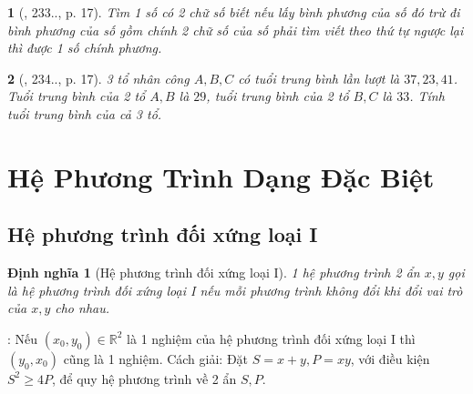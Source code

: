 \documentclass{article}
\newtheorem{baitoan}{}
\newtheorem{dinhnghia}{Định nghĩa}
\begin{document}
\begin{baitoan}[\cite{Binh_Toan_9_tap_2}, 233.., p. 17]
	Tìm 1 số có 2 chữ số biết nếu lấy bình phương của số đó trừ đi bình phương của số gồm chính 2 chữ số của số phải tìm viết theo thứ tự ngược lại thì được 1 số chính phương.
\end{baitoan}

\begin{baitoan}[\cite{Binh_Toan_9_tap_2}, 234.., p. 17]
	3 tổ nhân công $A,B,C$ có tuổi trung bình lần lượt là $37,23,41$. Tuổi trung bình của 2 tổ $A,B$ là $29$, tuổi trung bình của 2 tổ $B,C$ là $33$. Tính tuổi trung bình của cả 3 tổ.
\end{baitoan}


\section{Hệ Phương Trình Dạng Đặc Biệt}

\subsection{Hệ phương trình đối xứng loại I}

\begin{dinhnghia}[Hệ phương trình đối xứng loại I]
	1 hệ phương trình 2 ẩn $x,y$ gọi là {hệ phương trình đối xứng loại I} nếu mỗi phương trình không đổi khi đổi vai trò của $x,y$ cho nhau.
\end{dinhnghia}
: Nếu $(x_0,y_0)\in\mathbb{R}^2$ là 1 nghiệm của hệ phương trình đối xứng loại I thì $(y_0,x_0)$ cũng là 1 nghiệm. {\sf Cách giải}: Đặt $S = x + y,P = xy$, với điều kiện $S^2\ge4P$, để quy hệ phương trình về 2 ẩn $S,P$.
\end{document}
